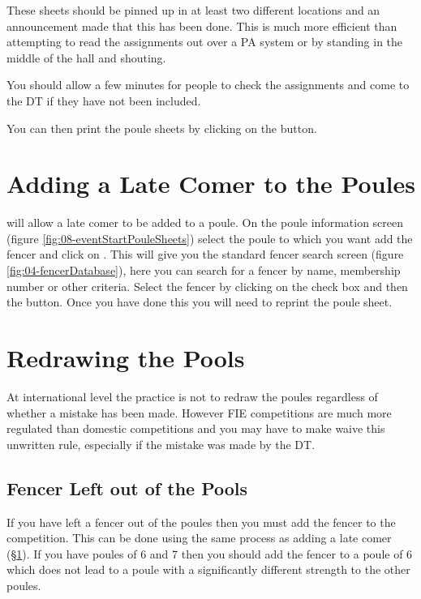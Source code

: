 \documentclass[a4paper,11pt]{memoir}
\begin{document}
These sheets should be pinned up in at least two different locations and an announcement made that this has been done. This is much more efficient than attempting to read the assignments out over a PA system or by standing in the middle of the hall and shouting.

You should allow a few minutes for people to check the assignments and come to the DT if they have not been included. 

You can then print the poule sheets by clicking on the  button.

\section{Adding a Late Comer to the Poules}\label{sec:pouleLatecomer}

\fencingtime{} will allow a late comer to be added to a poule. On the poule information screen (figure \ref{fig:08-eventStartPouleSheets}) select the poule to which you want add the fencer and click on . This will give you the standard fencer search screen (figure \ref{fig:04-fencerDatabase}), here you can search for a fencer by name, membership number or other criteria. Select the fencer by clicking on the check box and then the  button. Once you have done this you will need to reprint the poule sheet. 

\section{Redrawing the Pools}

At international level the practice is not to redraw the poules regardless of whether a mistake has been made. However FIE competitions are much more regulated than domestic competitions and you may have to make waive this unwritten rule, especially if the mistake was made by the DT.

\subsection{Fencer Left out of the Pools}

If you have left a fencer out of the poules then you must add the fencer to the competition. This can be done using the same process as adding a late comer (\S\ref{sec:pouleLatecomer}). If you have poules of 6 and 7 then you should add the fencer to a poule of 6 which does not lead to a poule with a significantly different strength to the other poules.
\end{document}
